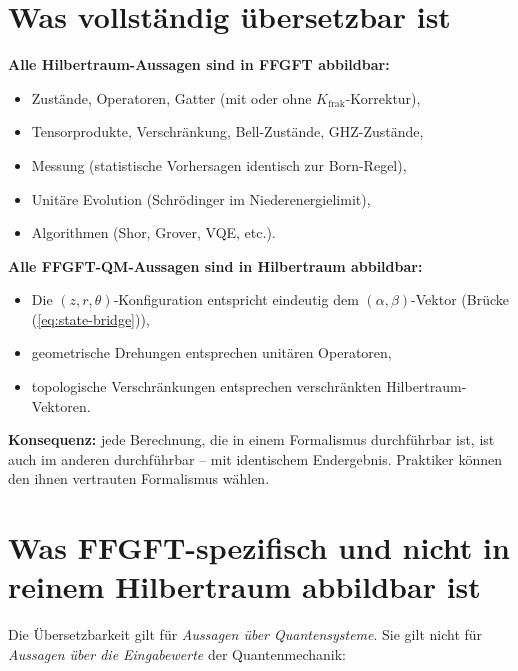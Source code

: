 \section{Was vollständig übersetzbar ist}

\textbf{Alle Hilbertraum-Aussagen sind in FFGFT abbildbar:}
\begin{itemize}[leftmargin=2em,itemsep=2pt,topsep=2pt]
  \item Zustände, Operatoren, Gatter (mit oder ohne $K_{\text{frak}}$-Korrektur),
  \item Tensorprodukte, Verschränkung, Bell-Zustände, GHZ-Zustände,
  \item Messung (statistische Vorhersagen identisch zur Born-Regel),
  \item Unitäre Evolution (Schrödinger im Niederenergielimit),
  \item Algorithmen (Shor, Grover, VQE, etc.).
\end{itemize}

\textbf{Alle FFGFT-QM-Aussagen sind in Hilbertraum abbildbar:}
\begin{itemize}[leftmargin=2em,itemsep=2pt,topsep=2pt]
  \item Die $(z, r, \theta)$-Konfiguration entspricht eindeutig dem
        $(\alpha, \beta)$-Vektor (Brücke (\ref{eq:state-bridge})),
  \item geometrische Drehungen entsprechen unitären Operatoren,
  \item topologische Verschränkungen entsprechen verschränkten
        Hilbertraum-Vektoren.
\end{itemize}

\textbf{Konsequenz:} jede Berechnung, die in einem Formalismus
durchführbar ist, ist auch im anderen durchführbar -- mit identischem
Endergebnis. Praktiker können den ihnen vertrauten Formalismus
wählen.

\section{Was FFGFT-spezifisch und nicht in reinem Hilbertraum abbildbar ist}

Die Übersetzbarkeit gilt für \emph{Aussagen über Quantensysteme}.
Sie gilt nicht für \emph{Aussagen über die Eingabewerte} der
Quantenmechanik:

